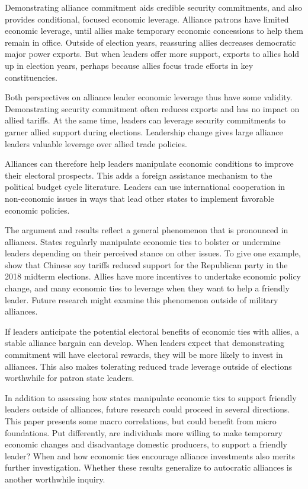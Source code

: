 \documentclass[12pt]{article}
\begin{document}
Demonstrating alliance commitment aids credible security commitments, and also provides conditional, focused economic leverage. 
Alliance patrons have limited economic leverage, until allies make temporary economic concessions to help them remain in office. 
Outside of election years, reassuring allies decreases democratic major power exports.
But when leaders offer more support, exports to allies hold up in election years, perhaps because allies focus trade efforts in key constituencies.


Both perspectives on alliance leader economic leverage thus have some validity. 
Demonstrating security commitment often reduces exports and has no impact on allied tariffs. 
At the same time, leaders can leverage security commitments to garner allied support during elections. 
Leadership change gives large alliance leaders valuable leverage over allied trade policies. 


Alliances can therefore help leaders manipulate economic conditions to improve their electoral prospects. 
This adds a foreign assistance mechanism to the political budget cycle literature.
Leaders can use international cooperation in non-economic issues in ways that lead other states to implement favorable economic policies. 


The argument and results reflect a general phenomenon that is pronounced in alliances. 
States regularly manipulate economic ties to bolster or undermine leaders depending on their perceived stance on other issues. 
To give one example, \citep{ChyzhUrbatsch2021} show that Chinese soy tariffs reduced support for the Republican party in the 2018 midterm elections. 
Allies have more incentives to undertake economic policy change, and many economic ties to leverage when they want to help a friendly leader. 
Future research might examine this phenomenon outside of military alliances.


If leaders anticipate the potential electoral benefits of economic ties with allies, a stable alliance bargain can develop.
When leaders expect that demonstrating commitment will have electoral rewards, they will be more likely to invest in alliances. 
This also makes tolerating reduced trade leverage outside of elections worthwhile for patron state leaders.


In addition to assessing how states manipulate economic ties to support friendly leaders outside of alliances, future research could proceed in several directions. 
This paper presents some macro correlations, but could benefit from micro foundations. 
Put differently, are individuals more willing to make temporary economic changes and disadvantage domestic producers, to support a friendly leader? 
When and how economic ties encourage alliance investments also merits further investigation.
Whether these results generalize to autocratic alliances is another worthwhile inquiry. 
\end{document}
